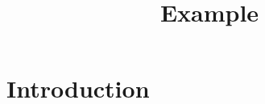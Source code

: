 \documentclass{article}
\title{Example}
\begin{document}
\maketitle

\section{Introduction}
\end{document}
